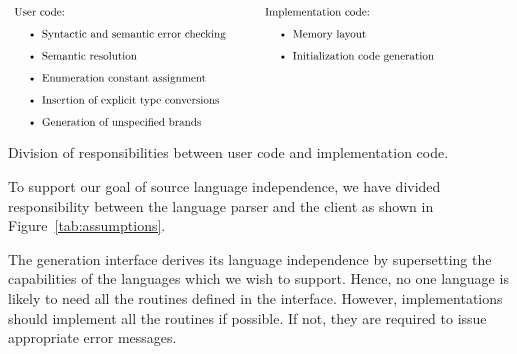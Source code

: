 \begin{table}
\[\begin{array}{cc}
\begin{minipage}[t]{3.0in}
User code:
\begin{itemize}
\item Syntactic and semantic error checking
\item Semantic resolution
\item Enumeration constant assignment
\item Insertion of explicit type conversions
\item Generation of unspecified brands
\end{itemize}
\end{minipage} &
\begin{minipage}[t]{3.0in}
Implementation code:
\begin{itemize}
\item Memory layout
\item Initialization code generation
\end{itemize}
\end{minipage}
\end{array}\]
\caption{\label{tab:assumptions}Division of responsibilities between
user code and implementation code.}
\end{table}

To support our goal of source language independence, we have divided
responsibility between the language parser and the client as shown in 
Figure~\ref{tab:assumptions}.  

The generation interface derives its language independence by
supersetting the capabilities of the languages which we wish to
support.  Hence, no one language is likely to need all the routines
defined in the interface.  However, implementations should implement
all the routines if possible.  If not, they are required to issue
appropriate error messages.



